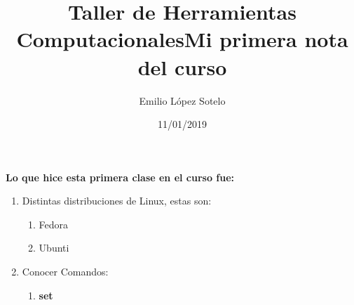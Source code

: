 \documentclass[letterpaper, 12pt, oneside]{article}%
\title{\Huge Taller de Herramientas Computacionales}
\author{Emilio López Sotelo}
\date{11/01/2019}
\begin{document}
	
	\maketitle
	\newpage
	
	\title{\Huge Mi primera nota del curso\\}
	
	\textbf{Lo que hice esta primera clase en el curso fue:}
	\begin{enumerate}
		\item Distintas distribuciones de Linux, estas son:
		\begin{enumerate}
			\item Fedora
			\item Ubunti
			\end{enumerate}
		\item Conocer Comandos:
		\begin{enumerate}
			\item \color{blue}\textbf{set}
		\end{enumerate}
	\end{enumerate}
\end{document}
